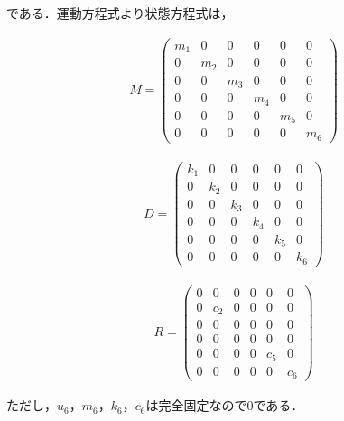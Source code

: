 である．運動方程式より状態方程式は，

\begin{eqnarray}
    M = 
    \left(\begin{matrix}
        m_1 & 0   & 0   & 0   & 0   & 0   \\
        0   & m_2 & 0   & 0   & 0   & 0   \\
        0   & 0   & m_3 & 0   & 0   & 0   \\
        0   & 0   & 0   & m_4 & 0   & 0   \\
        0   & 0   & 0   & 0   & m_5 & 0   \\
        0   & 0   & 0   & 0   & 0   & m_6
    \end{matrix}\right)
\end{eqnarray}

\begin{eqnarray}
    D =
    \left(\begin{matrix}
        k_1 & 0   & 0   & 0   & 0   & 0   \\
        0   & k_2 & 0   & 0   & 0   & 0   \\
        0   & 0   & k_3 & 0   & 0   & 0   \\
        0   & 0   & 0   & k_4 & 0   & 0   \\
        0   & 0   & 0   & 0   & k_5 & 0   \\
        0   & 0   & 0   & 0   & 0   & k_6
    \end{matrix}\right)
\end{eqnarray}

\begin{eqnarray}
    R = 
    \left(\begin{matrix}
        0   & 0   & 0   & 0   & 0   & 0   \\
        0   & c_2 & 0   & 0   & 0   & 0   \\
        0   & 0   & 0   & 0   & 0   & 0   \\
        0   & 0   & 0   & 0   & 0   & 0   \\
        0   & 0   & 0   & 0   & c_5 & 0   \\
        0   & 0   & 0   & 0   & 0   & c_6
    \end{matrix}\right)
\end{eqnarray}

ただし，$u_6$，$m_6$，$k_6$，$c_6$は完全固定なので$0$である．